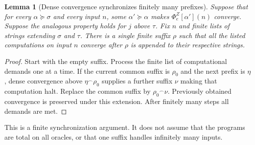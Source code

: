 \documentclass[11pt,a4paper]{article}
\newcommand{\cat}{\mathbin{{}^{\frown}}}
\newcommand{\phiZ}[2]{\Phi_{#1}^{Z}[#2]}
\newtheorem{lemma}[theorem]{Lemma}
\theoremstyle{definition}\newtheorem{definition}[theorem]{Definition}
\theoremstyle{remark}\newtheorem{remark}[theorem]{Remark}
\begin{document}
\begin{lemma}[Dense convergence synchronizes finitely many prefixes]
\label{lem:synchronization}
Suppose that for every $\alpha\succeq\sigma$ and every input $n$, some $\alpha'\succeq\alpha$ makes $\phiZ{e}{\alpha'}(n)$ converge. Suppose the analogous property holds for $j$ above $\tau$. Fix $n$ and finite lists of strings extending $\sigma$ and $\tau$. There is a single finite suffix $\rho$ such that all the listed computations on input $n$ converge after $\rho$ is appended to their respective strings.
\end{lemma}
\begin{proof}
Start with the empty suffix. Process the finite list of computational demands one at a time. If the current common suffix is $\rho_0$ and the next prefix is $\eta$, dense convergence above $\eta\cat\rho_0$ supplies a further suffix $\nu$ making that computation halt. Replace the common suffix by $\rho_0\cat\nu$. Previously obtained convergence is preserved under this extension. After finitely many steps all demands are met.
\end{proof}

This is a finite synchronization argument. It does not assume that the programs are total on all oracles, or that one suffix handles infinitely many inputs.
\end{document}
